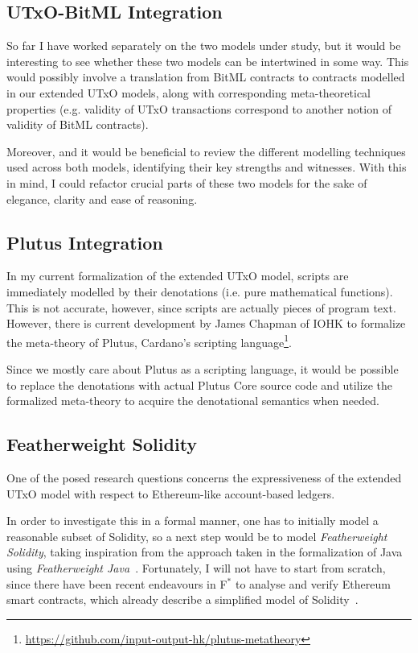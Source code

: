 \documentclass[acmsmall,nonacm=true,screen=true]{acmart}
\newcommand\site[1]{\footnote{\url{#1}}}
\begin{document}
\subsection{UTxO-BitML Integration}
So far I have worked separately on the two models under study, but it would be interesting to see whether these two
models can be intertwined in some way.
This would possibly involve a translation from BitML contracts to contracts modelled in our extended UTxO models,
along with corresponding meta-theoretical properties (e.g. validity of UTxO transactions correspond to another notion
of validity of BitML contracts).

Moreover, and it would be beneficial to review the different modelling techniques used across both models,
identifying their key strengths and witnesses.
With this in mind, I could refactor crucial parts of these two models for the sake of elegance, clarity and ease of reasoning.

\subsection{Plutus Integration}
In my current formalization of the extended UTxO model, scripts are immediately modelled by their denotations
(i.e. pure mathematical functions). This is not accurate, however, since scripts are actually pieces of program text.
However, there is current development by James Chapman of IOHK to formalize the meta-theory of Plutus,
Cardano's scripting language\site{https://github.com/input-output-hk/plutus-metatheory}.

Since we mostly care about Plutus as a scripting language, it would be possible to replace the denotations with
actual Plutus Core source code and utilize the formalized meta-theory to acquire the denotational semantics when needed.

\subsection{Featherweight Solidity}
One of the posed research questions concerns the expressiveness of the extended UTxO model with respect to
Ethereum-like account-based ledgers.

In order to investigate this in a formal manner, one has to initially model a reasonable subset of Solidity,
so a next step would be to model \textit{Featherweight Solidity}, taking inspiration from the
approach taken in the formalization of Java using \textit{Featherweight Java}~\cite{featherweightjava}.
Fortunately, I will not have to start from scratch, since there have been recent endeavours in F$^*$ to analyse and
verify Ethereum smart contracts, which already describe a simplified model of Solidity~\cite{short}.
\end{document}
